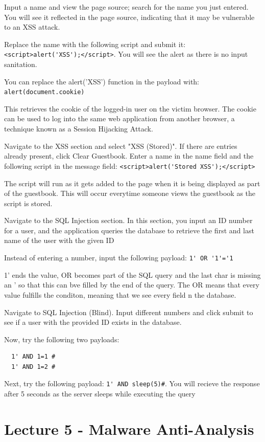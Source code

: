 \documentclass[]{project_plan}
\begin{document}
Input a name and view the page source; search for the name you just entered.
You will see it reflected in the page source, indicating that it may be vulnerable
to an XSS attack.

Replace the name with the following script and submit it:
\lstinline|<script>alert('XSS');</script>|. You will see the alert as there is
no input sanitation.

You can replace the alert('XSS') function in the payload with:
\lstinline|alert(document.cookie)|

This retrieves the cookie of the logged-in user on the victim browser. The
cookie can be used to log into the same web application from another browser,
a technique known as a Session Hijacking Attack.

Navigate to the XSS section and select "XSS (Stored)". If there are
entries already present, click Clear Guestbook. Enter a name in the
name field and the following script in the message field:
\lstinline|<script>alert('Stored XSS');</script>|

The script will run as it gets added to the page when it is being displayed as
part of the guestbook. This will occur everytime someone views the guestbook as
the script is stored.

Navigate to the SQL Injection section. In this section, you input an ID
number for a user, and the application queries the database to retrieve
the first and last name of the user with the given ID

Instead of entering a number, input the following payload:
\lstinline|1' OR '1'='1|

1' ends the value, OR becomes part of the SQL query and the last char is missing
an ' so that this can bve filled by the end of the query. The OR means that every
value fulfills the conditon, meaning that we see every field n the database.

Navigate to SQL Injection (Blind). Input different numbers and click
submit to see if a user with the provided ID exists in the database.

Now, try the following two payloads:
\begin{lstlisting}
  1' AND 1=1 #
  1' AND 1=2 #
\end{lstlisting}

Next, try the following payload:
\lstinline|1' AND sleep(5)#|. You will recieve the response after 5 seconds as
the server sleeps while executing the query

\chapter{Lecture 5 - Malware Anti-Analysis}
\end{document}
